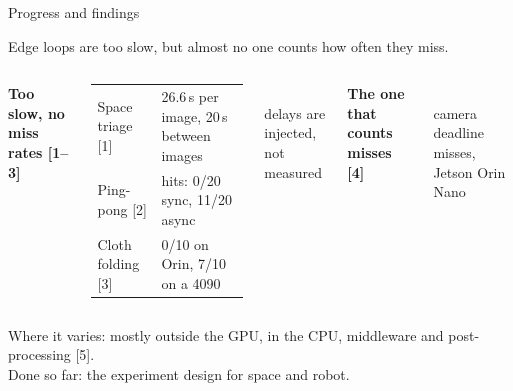 \documentclass[11pt,aspectratio=169]{beamer}
\begin{document}
\begin{frame}{Progress and findings}

\vspace{0.3cm}
{\centering\large Edge loops are too slow, but almost no one counts how often they miss.\par} %

\vspace{0.3cm}
\begin{columns}[T,onlytextwidth]
{\small\bfseries Too slow, no miss rates [1--3]}\\[0.3em] %
\footnotesize
\renewcommand{\arraystretch}{1.3}\setlength{\tabcolsep}{3pt}
\begin{tabular}{@{}l|l@{}}
\toprule
Space triage [1] & 26.6\,s per image, 20\,s between images \\
Ping-pong [2] & hits: 0/20 sync, 11/20 async \\
Cloth folding [3] & 0/10 on Orin, 7/10 on a 4090 \\
\bottomrule
\end{tabular}\\[0.3em]
{\scriptsize\color{gray2} delays are injected, not measured} %

{\small\bfseries The one that counts misses [4]}\\[0.4em] %
\\[0.3em]
{\scriptsize\color{gray2} camera deadline misses, Jetson Orin Nano} %
\end{columns}

\vspace{0.7cm}
\small
Where it varies: mostly outside the GPU, in the CPU, middleware and post-processing [5]. %
\\[0.3em]
Done so far: the experiment design for space and robot. %

\end{frame}
\end{document}
